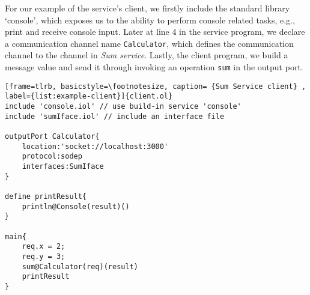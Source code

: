 For our example of the service's client, we firstly include the standard library `console', which exposes us to the ability to perform console related tasks, e.g., print and receive console input. Later at line 4 in the service program, we declare a communication channel name \texttt{Calculator}, which defines the communication channel to the channel in \textit{Sum service}. Lastly, the client program, we build a message value and send it through invoking an operation \texttt{sum} in the output port.

\begin{listing}[ht]
    \lstset{language=Jolie,
        style=codeStyle,
        numbers=left,
        firstnumber=1
    }
\begin{lstlisting}[frame=tlrb, basicstyle=\footnotesize, caption= {Sum Service client} , label={list:example-client}]{client.ol}
include 'console.iol' // use build-in service 'console'
include 'sumIface.iol' // include an interface file 

outputPort Calculator{
    location:'socket://localhost:3000'
    protocol:sodep 
    interfaces:SumIface
}

define printResult{
    println@Console(result)()
}

main{
    req.x = 2;
    req.y = 3;
    sum@Calculator(req)(result)
    printResult
}
\end{lstlisting}
\end{listing}

\FloatBarrier
